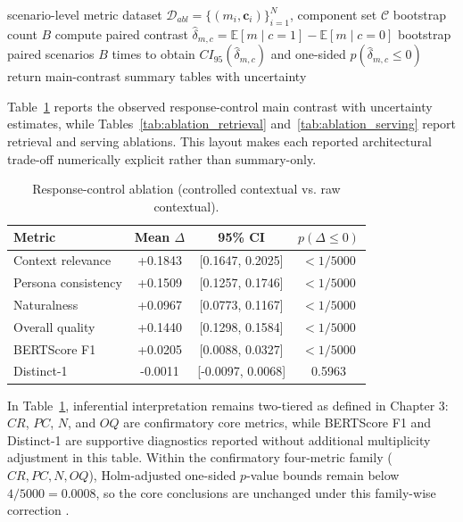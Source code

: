 ﻿\documentclass[a4paper,12pt]{article}
\newcommand{\BootstrapSamples}{5000}
\begin{document}
\begin{algorithm}[H]
\caption{Main-contrast ablation effect estimation}
\begin{algorithmic}[1]
\Require scenario-level metric dataset \(\mathcal{D}_{abl}=\{(m_i,\mathbf{c}_i)\}_{i=1}^{N}\), component set \(\mathcal{C}\)
\Require bootstrap count \(B\)
    \State compute paired contrast \(\hat{\delta}_{m,c}=\mathbb{E}[m\mid c{=}1]-\mathbb{E}[m\mid c{=}0]\)
    \State bootstrap paired scenarios \(B\) times to obtain \(CI_{95}(\hat{\delta}_{m,c})\) and one-sided \(p(\hat{\delta}_{m,c}\le0)\)
  \EndFor
\EndFor
\State return main-contrast summary tables with uncertainty
\end{algorithmic}
\end{algorithm}

Table~\ref{tab:ablation_response_control} reports the observed response-control main contrast with uncertainty estimates, while Tables~\ref{tab:ablation_retrieval} and~\ref{tab:ablation_serving} report retrieval and serving ablations. This layout makes each reported architectural trade-off numerically explicit rather than summary-only.

\begin{table}[t]
\centering
\caption{Response-control ablation (controlled contextual vs. raw contextual).}
\label{tab:ablation_response_control}
\begingroup
\footnotesize
\setlength{\tabcolsep}{4pt}
\begin{tabular}{lccc}
\toprule
Metric & Mean \(\Delta\) & 95\% CI & \(p(\Delta\le0)\) \\
\midrule
Context relevance & +0.1843 & [0.1647, 0.2025] & \(<1/\BootstrapSamples\) \\
Persona consistency & +0.1509 & [0.1257, 0.1746] & \(<1/\BootstrapSamples\) \\
Naturalness & +0.0967 & [0.0773, 0.1167] & \(<1/\BootstrapSamples\) \\
Overall quality & +0.1440 & [0.1298, 0.1584] & \(<1/\BootstrapSamples\) \\
BERTScore F1 & +0.0205 & [0.0088, 0.0327] & \(<1/\BootstrapSamples\) \\
Distinct-1 & -0.0011 & [-0.0097, 0.0068] & 0.5963 \\
\bottomrule
\end{tabular}
\endgroup
\end{table}

In Table~\ref{tab:ablation_response_control}, inferential interpretation remains two-tiered as defined in Chapter 3: \(CR\), \(PC\), \(N\), and \(OQ\) are confirmatory core metrics, while BERTScore F1 and Distinct-1 are supportive diagnostics reported without additional multiplicity adjustment in this table.
Within the confirmatory four-metric family (\(CR,PC,N,OQ\)), Holm-adjusted one-sided \(p\)-value bounds remain below \(4/\BootstrapSamples=0.0008\), so the core conclusions are unchanged under this family-wise correction \cite{Holm1979}.
\end{document}
